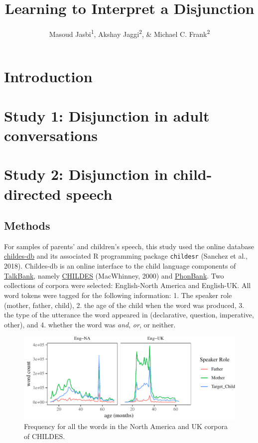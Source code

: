 \documentclass[floatsintext,man]{apa6}
\title{Learning to Interpret a Disjunction}
\author{Masoud Jasbi\textsuperscript{1}, Akshay Jaggi\textsuperscript{2}, \& Michael C. Frank\textsuperscript{2}}
\affiliation{
    \vspace{0.5cm}
          \textsuperscript{1} Harvard University\\
          \textsuperscript{2} Stanford University  }
\theoremstyle{definition}
\theoremstyle{definition}
\theoremstyle{definition}
\theoremstyle{remark}
\begin{document}
\maketitle

\setcounter{secnumdepth}{0}



\section{Introduction}\label{introduction}

\section{Study 1: Disjunction in adult
conversations}\label{study-1-disjunction-in-adult-conversations}

\section{Study 2: Disjunction in child-directed
speech}\label{study-2-disjunction-in-child-directed-speech}

\subsection{Methods}\label{methods}

For samples of parents' and children's speech, this study used the
online database \href{childes-db.stanford.edu}{childes-db} and its
associated R programming package \texttt{childesr} (Sanchez et al.,
2018). Childes-db is an online interface to the child language
components of \href{https://talkbank.org/}{TalkBank}, namely
\href{https://childes.talkbank.org/}{CHILDES} (MacWhinney, 2000) and
\href{https://phonbank.talkbank.org/}{PhonBank}. Two collections of
corpora were selected: English-North America and English-UK. All word
tokens were tagged for the following information: 1. The speaker role
(mother, father, child), 2. the age of the child when the word was
produced, 3. the type of the utterance the word appeared in
(declarative, question, imperative, other), and 4. whether the word was
\emph{and}, \emph{or}, or neither.

\begin{figure}[tb]

{\centering \includegraphics{figs/corpusDensityPlot-1} 

}

\caption{Frequency for all the words in the North America and UK corpora of CHILDES.}\label{fig:corpusDensityPlot}
\end{figure}
\end{document}
